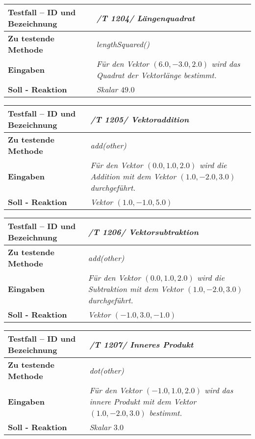 \begin{longtable}{|p{7cm}|p{10cm}|}
\hline
\textbf{Testfall -- ID und Bezeichnung} & \textit{ /T 1204/ Längenquadrat} \\
\hline
\textbf{Zu testende Methode} &  \textit{lengthSquared()} \\
\hline
\textbf{Eingaben} & \textit{Für den Vektor $(6.0, -3.0, 2.0)$ wird das Quadrat der
Vektorlänge bestimmt.}\\
\hline
\textbf{Soll - Reaktion} & \textit{Skalar $49.0$} \\
\hline
\end{longtable}

\begin{longtable}{|p{7cm}|p{10cm}|}
\hline
\textbf{Testfall -- ID und Bezeichnung} & \textit{ /T 1205/ Vektoraddition} \\
\hline
\textbf{Zu testende Methode} &  \textit{add(other)} \\
\hline
\textbf{Eingaben} & \textit{Für den Vektor  $(0.0, 1.0, 2.0)$ wird die Addition mit
dem Vektor  $(1.0, -2.0, 3.0)$ durchgeführt.}\\
\hline
\textbf{Soll - Reaktion} & \textit{Vektor $(1.0, -1.0, 5.0)$} \\
\hline
\end{longtable}

\begin{longtable}{|p{7cm}|p{10cm}|}
\hline
\textbf{Testfall -- ID und Bezeichnung} & \textit{ /T 1206/ Vektorsubtraktion} \\
\hline
\textbf{Zu testende Methode} &  \textit{add(other)} \\
\hline
\textbf{Eingaben} & \textit{Für den Vektor  $(0.0, 1.0, 2.0)$ wird die Subtraktion mit
dem Vektor $(1.0, -2.0, 3.0)$ durchgeführt.}\\
\hline
\textbf{Soll - Reaktion} & \textit{Vektor $(-1.0, 3.0, -1.0)$} \\
\hline
\end{longtable}


\begin{longtable}{|p{7cm}|p{10cm}|}
\hline
\textbf{Testfall -- ID und Bezeichnung} & \textit{ /T 1207/ Inneres Produkt} \\
\hline
\textbf{Zu testende Methode} &  \textit{dot(other)} \\
\hline
\textbf{Eingaben} & \textit{Für den Vektor  $(-1.0, 1.0, 2.0)$ wird das innere Produkt mit
dem Vektor $(1.0, -2.0, 3.0)$ bestimmt.}\\
\hline
\textbf{Soll - Reaktion} & \textit{Skalar $3.0$} \\
\hline
\end{longtable}

